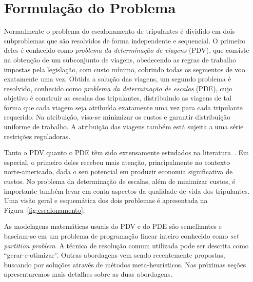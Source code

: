 \documentclass[12pt,a4paper]{article}
\newcommand{\zerar}{\setcounter{equation}{0}\setcounter{figure}{0}\setcounter{table}{0}}
\begin{document}

\zerar
\section{Formulação do Problema}
\label{sec:formulacao}

Normalmente o problema do escalonamento de tripulantes é dividido em dois subproblemas que são
resolvidos de forma independente e sequencial. O primeiro deles é conhecido como \emph{problema da
determinação de viagens} (PDV), que consiste na obtenção de um subconjunto de viagens, obedecendo as
regras de trabalho impostas pela legislação, com custo mínimo, cobrindo todas os segmentos de voo
exatamente uma vez. Obtida a solução das viagens, um segundo problema é resolvido, conhecido como
\emph{problema da determinação de escalas} (PDE), cujo objetivo é construir as escalas dos
tripulantes, distribuindo as viagens de tal forma que cada viagem seja atribuída exatamente uma vez
para cada tripulante requerido. Na atribuição, visa-se minimizar os custos e garantir distribuição
uniforme de trabalho. A atribuição das viagens também está sujeita a uma série restrições
reguladoras.

Tanto o PDV quanto o PDE têm sido extensamente estudados na literatura~\cite{gopalakrishnan05}. Em
especial, o primeiro deles recebeu mais atenção, principalmente no contexto norte-americado, dada o
seu potencial em produzir economia significativa de custos. No problema da determinação de escalas,
além de minimizar custos, é importante também levar em conta aspectos da qualidade de vida dos
tripulantes. Uma visão geral e esquemática dos dois problemas é apresentada na
Figura~\ref{fig:escalonamento}.

As modelagens matemáticas usuais do PDV e do PDE são semelhantes e baseiam-se em um problema de 
programação linear inteiro conhecido como \emph{set partition problem}. A técnica de resolução comum 
utilizada pode ser descrita como ``gerar-e-otimizar''. Outras abordagens vem sendo recentemente 
propostas, buscando por soluções através de métodos meta-heurísticos. Nas próximas seções 
apresentaremos mais detalhes sobre as duas abordagens.
\end{document}
